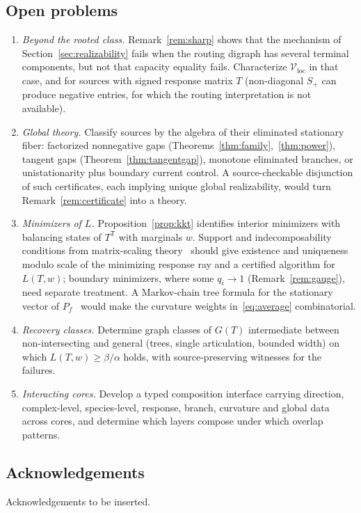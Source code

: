 \documentclass[11pt,reqno]{amsart}
\theoremstyle{plain}
\theoremstyle{definition}
\theoremstyle{remark}
\numberwithin{equation}{section}
\newcommand{\Sp}{S_{+}}
\newcommand{\T}{\mathsf{T}}
\newcommand{\Vloc}{\mathcal{V}_{\mathrm{loc}}}
\begin{document}
\subsection{Open problems}
\begin{enumerate}[label=(\arabic*)]
\item \emph{Beyond the rooted class.}  Remark~\ref{rem:sharp} shows that the mechanism of Section~\ref{sec:realizability} fails when the routing digraph has several terminal components, but not that capacity equality fails.  Characterize $\Vloc$ in that case, and for sources with signed response matrix $T$ (non-diagonal $\Sp$ can produce negative entries, for which the routing interpretation is not available).
\item \emph{Global theory.}  Classify sources by the algebra of their eliminated stationary fiber: factorized nonnegative gaps (Theorems~\ref{thm:family},~\ref{thm:power}), tangent gaps (Theorem~\ref{thm:tangentgap}), monotone eliminated branches, or unistationarity plus boundary current control.  A source-checkable disjunction of such certificates, each implying unique global realizability, would turn Remark~\ref{rem:certificate} into a theory.
\item \emph{Minimizers of $L$.}  Proposition~\ref{prop:kkt} identifies interior minimizers with balancing states of $T^{\T}$ with marginals $w$.  Support and indecomposability conditions from matrix-scaling theory~\cite{Idel16} should give existence and uniqueness modulo scale of the minimizing response ray and a certified algorithm for $L(T,w)$; boundary minimizers, where some $q_i\to1$ (Remark~\ref{rem:gauge}), need separate treatment.  A Markov-chain tree formula for the stationary vector of $P_f$~\cite{Sch76} would make the curvature weights in~\eqref{eq:average} combinatorial.
\item \emph{Recovery classes.}  Determine graph classes of $G(T)$ intermediate between non-intersecting and general (trees, single articulation, bounded width) on which $L(T,w)\ge\beta/\alpha$ holds, with source-preserving witnesses for the failures.
\item \emph{Interacting cores.}  Develop a typed composition interface carrying direction, complex-level, species-level, response, branch, curvature and global data across cores, and determine which layers compose under which overlap patterns.
\end{enumerate}

\subsection*{Acknowledgements}
Acknowledgements to be inserted.
\end{document}
